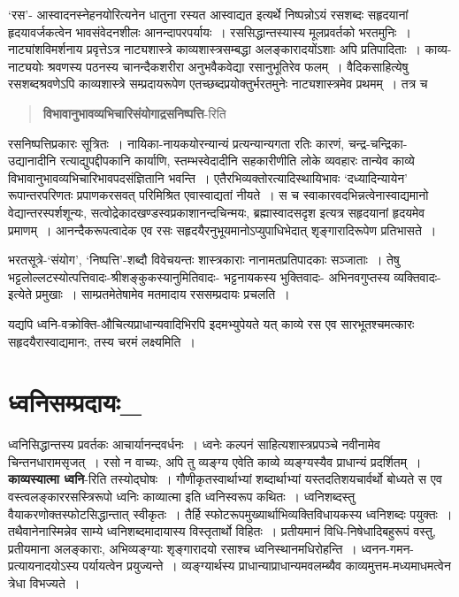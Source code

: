 {‘रस’- आस्वादनस्नेहनयोरित्यनेन धातुना रस्यत आस्वाद्यत इत्यर्थे निष्पन्नोऽयं रसशब्दः सहृदयानां हृदयावर्जकत्वेन भावसंवेदनशीलः आनन्दापरपर्यायः~। रससिद्धान्तस्यास्य मूलप्रवर्तको भरतमुनिः~। नाट्यांशविमर्शनाय प्रवृत्तेऽत्र नाट्यशास्त्रे काव्यशास्त्रसम्बद्धा अलङ्कारादयोंऽशाः अपि प्रतिपादिताः~। काव्य-नाट्ययोः श्रवणस्य पठनस्य चानन्दैकशरीरा अनुभवैकवेद्या रसानुभूतिरेव फलम्~। वैदिकसाहित्येषु रसशब्दश्रवणेऽपि काव्यशास्त्रे सम्प्रदायरूपेण एतच्छब्दप्रयोक्तुर्भरतमुनेः नाट्यशास्त्रमेव प्रथमम्~। तत्र च 

\begin{verse}
\textbf{विभावानुभावव्यभिचारिसंयोगाद्रसनिष्पत्ति}-रिति 
\end{verse}

रसनिष्पत्तिप्रकारः सूत्रितः~। नायिका-नायकयोरन्यान्यं प्रत्यन्यान्यगता रतिः कारणं, चन्द्र-चन्द्रिका-उद्यानादीनि रत्याद्युपद्दीपकानि कार्याणि, स्तम्भस्वेदादीनि सहकारीणीति लोके व्यवहारः तान्येव काव्ये विभावानुभावव्यभिचारिभावपदसंज्ञितानि भवन्ति~। एतैरभिव्यक्तोरत्यादिस्थायिभावः ‘दध्यादिन्यायेन’ रूपान्तरपरिणतः प्रपाणकरसवत् परिमिश्रित एवास्वाद्यतां नीयते~। स च स्वाकारवदभिन्नत्वेनास्वाद्यमानो वेद्यान्तरस्पर्शशून्यः, सत्वोद्रेकादखण्डस्वप्रकाशानन्दचिन्मयः, ब्रह्मास्वादसदृश इत्यत्र सहृदयानां हृदयमेव प्रमाणम्~। आनन्दैकरूपत्वादेक एव रसः सहृदयैरनुभूयमानोऽप्युपाधिभेदात् शृङ्गारादिरूपेण प्रतिभासते~। 

भरतसूत्रे-‘संयोग’, ‘निष्पत्ति’-शब्दौ विवेचयन्तः शास्त्रकाराः नानामतप्रतिपादकाः सञ्जाताः~। तेषु भट्टलोल्लटस्योत्पत्तिवादः-श्रीशङ्कुकस्यानुमितिवादः- भट्टनायकस्य भुक्तिवादः- अभिनवगुप्तस्य व्यक्तिवादः-इत्येते प्रमुखाः~। साम्प्रतमेतेषामेव मतमादाय रससम्प्रदायः प्रचलति~। 

यद्यपि ध्वनि-वक्रोक्ति-औचित्यप्राधान्यवादिभिरपि इदमभ्युपेयते यत् काव्ये रस एव सारभूतश्चमत्कारः सहृदयैरास्वाद्यमानः, तस्य चरमं लक्ष्यमिति~। 

\section*{ ध्वनिसम्प्रदायः\_}

ध्वनिसिद्धान्तस्य प्रवर्तकः आचार्यानन्दवर्धनः~। ध्वनेः कल्पनं साहित्यशास्त्रप्रपञ्चे नवीनामेव चिन्तनधारामसृजत्~। रसो न वाच्यः, अपि तु व्यङ्ग्य एवेति काव्ये व्यङ्ग्यस्यैव प्राधान्यं प्रदर्शितम्~। \textbf{काव्यस्यात्मा ध्वनि}-रिति तस्योद्घोषः~। गौणीकृतस्वार्थाभ्यां शब्दार्थाभ्यां यस्तदतिशयचार्वर्थो बोध्यते स एव वस्त्वलङ्काररसस्त्रिरूपो ध्वनिः काव्यात्मा इति ध्वनिस्वरूप कथितः~। ध्वनिशब्दस्तु वैयाकरणोक्तस्फोटसिद्धान्तात् स्वीकृतः~। तैर्हि स्फोटरूपमुख्यार्थाभिव्यक्तिविधायकस्य ध्वनिशब्दः पयुक्तः~। तथैवानेनास्मिन्नेव साम्ये ध्वनिशब्दमादायास्य विस्तृतार्थो विहितः~। प्रतीयमानं विधि-निषेधादिबहुरूपं वस्तु, प्रतीयमाना अलङ्काराः, अभिव्यङ्ग्याः शृङ्गारादयो रसाश्च ध्वनिस्थानमधिरोहन्ति~। ध्वनन-गमन-प्रत्यायनादयोऽस्य पर्यायत्वेन प्रयुज्यन्ते~। व्यङ्ग्यार्थस्य प्राधान्याप्राधान्यमवलम्ब्यैव काव्यमुत्तम-मध्यमाधमत्वेन त्रेधा विभज्यते~। 

}
